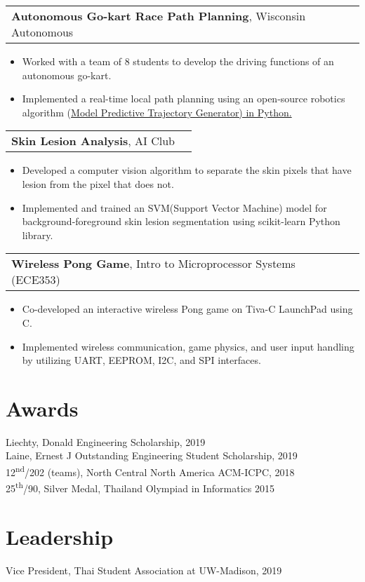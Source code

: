 \documentclass[letterpaper,11pt]{article}
\makeatletter
\newcommand{\resumeSubHeadingListStart}{\begin{itemize}[leftmargin=*,label={}]}
\newcommand{\resumeSubHeadingListEnd}{\end{itemize}}
\newcommand{\projtitle}[2]{
  \vspace{7pt}
  \begin{tabular*}{1.00\textwidth}[t]{l@{\extracolsep{\fill}}r}
    \textbf{#1}, #2 \\
  \end{tabular*}\vspace{-5pt}
}
\newcommand{\expstart}{\begin{itemize}[leftmargin=5mm]}
\newcommand{\expend}{\end{itemize}\vspace{-5pt}}
\newcommand{\expitem}[1]{\item\small{{#1 \vspace{-5pt}}}}
\makeatother
\begin{document}
  \projtitle{Autonomous Go-kart Race Path Planning}{Wisconsin Autonomous}
  \expstart
    \expitem{Worked with a team of 8 students to develop the driving functions of an autonomous go-kart.}
    \expitem{Implemented a real-time local path planning using an open-source robotics algorithm (\href{https://github.com/AtsushiSakai/PythonRobotics}{Model Predictive Trajectory Generator) in Python.}}
  \expend
  
  \projtitle{Skin Lesion Analysis}{AI Club}
  \expstart
    \expitem{Developed a computer vision algorithm to separate the skin pixels that have lesion from the pixel that does not.}
    \expitem{Implemented and trained an SVM(Support Vector Machine) model for background-foreground skin lesion segmentation using scikit-learn Python library.}
  \expend
  
  \projtitle{Wireless Pong Game}{Intro to Microprocessor Systems (ECE353)}
  \expstart
    \expitem{Co-developed an interactive wireless Pong game on Tiva-C LaunchPad using C. }
    \expitem{Implemented wireless communication, game physics, and user input handling by utilizing UART, EEPROM, I2C, and SPI interfaces.}
  \expend
  
\section{Awards}
  Liechty, Donald Engineering Scholarship, 2019\\
  Laine, Ernest J Outstanding Engineering Student Scholarship, 2019 \\
  12\textsuperscript{nd}/202 (teams), North Central North America ACM-ICPC, 2018 \\
  25\textsuperscript{th}/90, Silver Medal, Thailand Olympiad in Informatics 2015 \vspace{-2pt}
  
\section{Leadership}
   Vice President, Thai Student Association at UW-Madison, 2019
   

%


\end{document}
